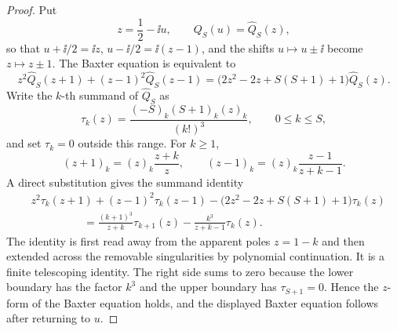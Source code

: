 \begin{proof}
Put
\[
  z=\frac12-\ii u,\qquad Q_S(u)=\widehat Q_S(z),
\]
so that \(u+\ii/2=\ii z\), \(u-\ii/2=\ii(z-1)\), and the shifts
\(u\mapsto u\pm\ii\) become \(z\mapsto z\pm1\).  The Baxter equation is
equivalent to
\[
  z^2\widehat Q_S(z+1)+(z-1)^2\widehat Q_S(z-1)
  =
  \bigl(2z^2-2z+S(S+1)+1\bigr)\widehat Q_S(z).
\]
Write the \(k\)-th summand of \(\widehat Q_S\) as
\[
  \tau_k(z)=
  \frac{(-S)_k(S+1)_k(z)_k}{(k!)^3},
  \qquad 0\leq k\leq S,
\]
and set \(\tau_k=0\) outside this range.  For \(k\geq1\),
\[
  (z+1)_k=(z)_k\frac{z+k}{z},
  \qquad
  (z-1)_k=(z)_k\frac{z-1}{z+k-1}.
\]
A direct substitution gives the summand identity
\[
\begin{aligned}
&z^2\tau_k(z+1)+(z-1)^2\tau_k(z-1)
  -\bigl(2z^2-2z+S(S+1)+1\bigr)\tau_k(z)  \\
&\hspace{2cm}
  =
  \frac{(k+1)^3}{z+k}\tau_{k+1}(z)
  -\frac{k^3}{z+k-1}\tau_k(z).
\end{aligned}
\]
The identity is first read away from the apparent poles \(z=1-k\) and then
extended across the removable singularities by polynomial continuation.  It is
a finite telescoping identity.  The right side sums to zero because the
lower boundary has the factor \(k^3\) and the upper boundary has
\(\tau_{S+1}=0\).  Hence the \(z\)-form of the Baxter equation holds, and the
displayed Baxter equation follows after returning to \(u\).


\end{proof}
